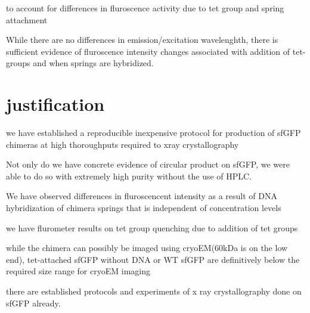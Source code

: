 \documentclass{article}
\begin{document}
\begin{proposition}
to account for differences in fluroscence activity due to tet group and spring attachment
\end{proposition}
While there are no differences in emission/excitation wavelenghth, there is sufficient evidence of fluroscence intensity changes associated with addition of tet-groups and when springs are hybridized.


\section{justification}

\begin{fact}
we have established a reproducible inexpensive protocol for production of sfGFP chimeras at high thoroughputs required to xray crystallography
\end{fact}
Not only do we have concrete evidence of circular product on sfGFP, we were able to do so with extremely high purity without the use of HPLC.

\begin{fact}
We have observed differences in fluroscencent intensity as a result of DNA hybridization of chimera springs that is independent of concentration levels
\end{fact}

\begin{fact}
we have flurometer results on tet group quenching due to addition of tet groups \end{fact}

\begin{fact}
while the chimera can possibly be imaged using cryoEM(60kDa is on the low end), tet-attached sfGFP without DNA or WT sfGFP are definitively below the required size range for cryoEM imaging
\end{fact}

\begin{fact}
there are established protocols and experiments of x ray crystallography done on sfGFP already. 
\end{fact}
\end{document}
